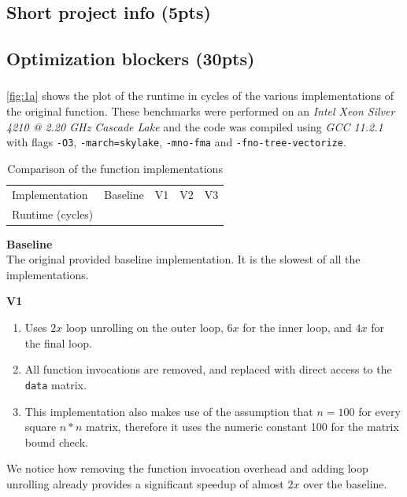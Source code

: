 \renewcommand{\thesubsubsection}{\alph{subsubsection})}
\setcounter{section}{2}
\setcounter{subsection}{0}

\subsection{Short project info (5pts)}

\subsection{Optimization blockers (30pts)}
\subsubsection{} %
\autoref{fig:1a} shows the plot of the runtime in cycles of the various implementations of the original function. These benchmarks were performed on an \textit{Intel Xeon Silver 4210 @ 2.20 GHz Cascade Lake} and the code was compiled using \textit{GCC 11.2.1} with flags \texttt{-O3}, \texttt{-march=skylake}, \texttt{-mno-fma} and \texttt{-fno-tree-vectorize}.
\begin{table}[h!]
    \centering
    \begin{tabular}{l|llll}
    \hline
    Implementation & Baseline & V1 & V2 & V3 \\
    Runtime (cycles) &  &  &  & \\
    \hline
    \end{tabular}
    \caption{Comparison of the function implementations}
    \vspace*{-0.3cm}
\end{table}

\textbf{Baseline}\\
The original provided baseline implementation. It is the slowest of all the implementations.

\textbf{V1}
\vspace*{-0.3cm}
\begin{enumerate}
\item Uses $2x$ loop unrolling on the outer loop, $6x$ for the inner loop, and $4x$ for the final loop. 
\item All function invocations are removed, and replaced with direct access to the \texttt{data} matrix. 
\item This implementation also makes use of the assumption that $n=100$ for every square $n*n$ matrix, therefore it uses the numeric constant 100 for the matrix bound check. 
\end{enumerate}
We notice how removing the function invocation overhead and adding loop unrolling already provides a significant speedup of almost $2x$ over the baseline.

